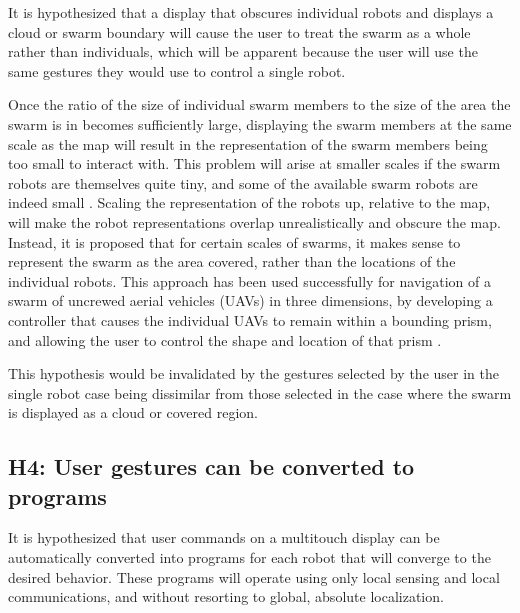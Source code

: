 It is hypothesized that a display that obscures individual robots and displays a cloud or swarm boundary will cause the user to treat the swarm as a whole rather than individuals, which will be apparent because the user will use the same gestures they would use to control a single robot. 

Once the ratio of the size of individual swarm members to the size of the area the swarm is in becomes sufficiently large, displaying the swarm members at the same scale as the map will result in the representation of the swarm members being too small to interact with. 
This problem will arise at smaller scales if the swarm robots are themselves quite tiny, and some of the available swarm robots are indeed small \citep{pelrine2012diamagnetically}.
Scaling the representation of the robots up, relative to the map, will make the robot representations overlap unrealistically and obscure the map. 
Instead, it is proposed that for certain scales of swarms, it makes sense to represent the swarm as the area covered, rather than the locations of the individual robots.
This approach has been used successfully for navigation of a swarm of uncrewed aerial vehicles (UAVs) in three dimensions, by developing a controller that causes the individual UAVs to remain within a bounding prism, and allowing the user to control the shape and location of that prism \citep{ayanian2014controlling}.

This hypothesis would be invalidated by the gestures selected by the user in the single robot case being dissimilar from those selected in the case where the swarm is displayed as a cloud or covered region. 

\subsection{H4: User gestures can be converted to programs}

It is hypothesized that user commands on a multitouch display can be automatically converted into programs for each robot that will converge to the desired behavior. These programs will operate using only local sensing and local communications, and without resorting to global, absolute localization. 

